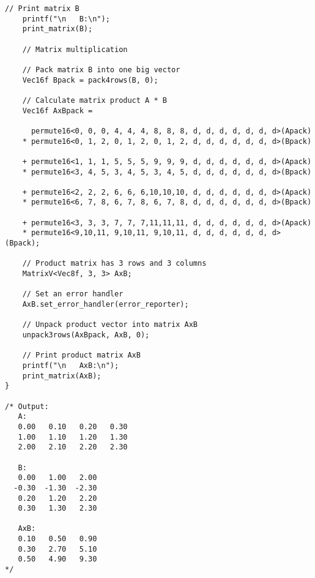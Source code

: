 \documentclass[11pt,a4paper,oneside,openright]{report}
\newcommand{\vspacebig}{\vspace{6mm}}
\begin{document}
\begin{lstlisting}[frame=none]
    // Print matrix B
    printf("\n   B:\n");
    print_matrix(B);

    // Matrix multiplication

    // Pack matrix B into one big vector
    Vec16f Bpack = pack4rows(B, 0);

    // Calculate matrix product A * B
    Vec16f AxBpack =
    
      permute16<0, 0, 0, 4, 4, 4, 8, 8, 8, d, d, d, d, d, d, d>(Apack)
    * permute16<0, 1, 2, 0, 1, 2, 0, 1, 2, d, d, d, d, d, d, d>(Bpack)

    + permute16<1, 1, 1, 5, 5, 5, 9, 9, 9, d, d, d, d, d, d, d>(Apack)
    * permute16<3, 4, 5, 3, 4, 5, 3, 4, 5, d, d, d, d, d, d, d>(Bpack)

    + permute16<2, 2, 2, 6, 6, 6,10,10,10, d, d, d, d, d, d, d>(Apack)
    * permute16<6, 7, 8, 6, 7, 8, 6, 7, 8, d, d, d, d, d, d, d>(Bpack)

    + permute16<3, 3, 3, 7, 7, 7,11,11,11, d, d, d, d, d, d, d>(Apack)
    * permute16<9,10,11, 9,10,11, 9,10,11, d, d, d, d, d, d, d>(Bpack);

    // Product matrix has 3 rows and 3 columns
    MatrixV<Vec8f, 3, 3> AxB;

    // Set an error handler
    AxB.set_error_handler(error_reporter);

    // Unpack product vector into matrix AxB
    unpack3rows(AxBpack, AxB, 0);

    // Print product matrix AxB
    printf("\n   AxB:\n");
    print_matrix(AxB);
}

/* Output:
   A:
   0.00   0.10   0.20   0.30
   1.00   1.10   1.20   1.30
   2.00   2.10   2.20   2.30

   B:
   0.00   1.00   2.00
  -0.30  -1.30  -2.30
   0.20   1.20   2.20
   0.30   1.30   2.30

   AxB:
   0.10   0.50   0.90
   0.30   2.70   5.10
   0.50   4.90   9.30
*/
\end{lstlisting}
\vspacebig
\end{document}
